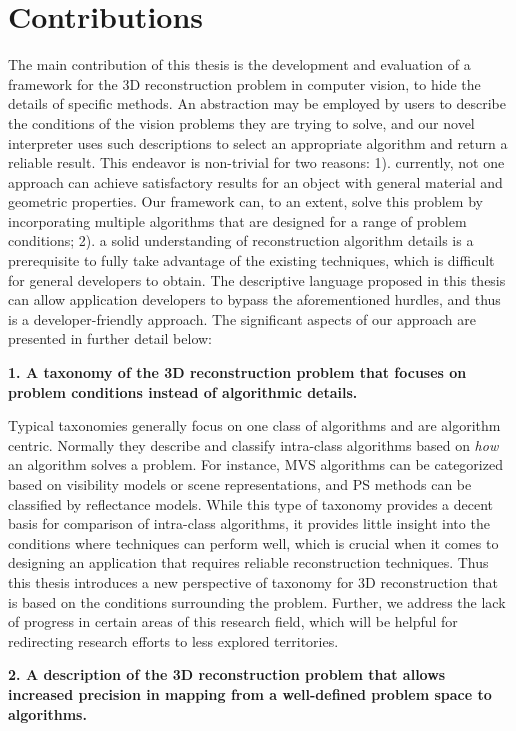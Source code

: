 \section{Contributions}
The main contribution of this thesis is the development and evaluation of a framework for the 3D reconstruction problem in computer vision, to hide the details of specific methods. An abstraction may be employed by users to describe the conditions of the vision problems they are trying to solve, and our novel interpreter uses such descriptions to select an appropriate algorithm and return a reliable result. This endeavor is non-trivial for two reasons: 1). currently, not one approach can achieve satisfactory results for an object with general material and geometric properties. Our framework can, to an extent, solve this problem by incorporating multiple algorithms that are designed for a range of problem conditions; 2). a solid understanding of reconstruction algorithm details is a prerequisite to fully take advantage of the existing techniques, which is difficult for general developers to obtain. The descriptive language proposed in this thesis can allow application developers to bypass the aforementioned hurdles, and thus is a developer-friendly approach. The significant aspects of our approach are presented in further detail below:

\noindent\textbf{1. A taxonomy of the 3D reconstruction problem that focuses on problem conditions instead of algorithmic details.}

Typical taxonomies generally focus on one class of algorithms and are algorithm centric. Normally they describe and classify intra-class algorithms based on \textit{how} an algorithm solves a problem. For instance, MVS algorithms can be categorized based on visibility models or scene representations, and PS methods can be classified by reflectance models. While this type of taxonomy provides a decent basis for comparison of intra-class algorithms, it provides little insight into the conditions where techniques can perform well, which is crucial when it comes to designing an application that requires reliable reconstruction techniques. Thus this thesis introduces a new perspective of taxonomy for 3D reconstruction that is based on the conditions surrounding the problem. Further, we address the lack of progress in certain areas of this research field, which will be helpful for redirecting research efforts to less explored territories.

\noindent\textbf{2. A description of the 3D reconstruction problem that allows increased precision in mapping from a well-defined problem space to algorithms.}

